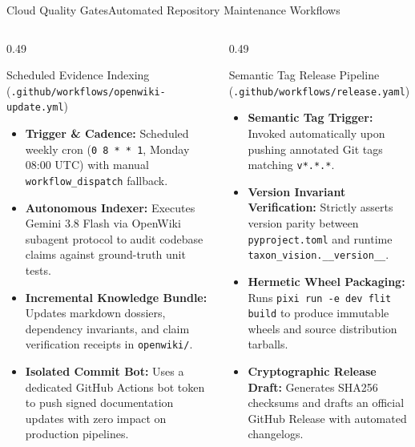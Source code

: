 \begin{frame}{Cloud Quality Gates}{Automated Repository Maintenance Workflows}
    \begin{columns}[T]
    \begin{column}{0.49\textwidth}
    \begin{block}{\small Scheduled Evidence Indexing (\texttt{.github/workflows/openwiki-update.yml})}
        \begin{itemize}\footnotesize
            \item \textbf{Trigger \& Cadence:} Scheduled weekly cron (\texttt{0 8 * * 1}, Monday 08:00 UTC) with manual \texttt{workflow\_dispatch} fallback.
            \item \textbf{Autonomous Indexer:} Executes Gemini 3.8 Flash via OpenWiki subagent protocol to audit codebase claims against ground-truth unit tests.
            \item \textbf{Incremental Knowledge Bundle:} Updates markdown dossiers, dependency invariants, and claim verification receipts in \texttt{openwiki/}.
            \item \textbf{Isolated Commit Bot:} Uses a dedicated GitHub Actions bot token to push signed documentation updates with zero impact on production pipelines.
        \end{itemize}
    \end{block}
    \end{column}
    \begin{column}{0.49\textwidth}
    \begin{block}{\small Semantic Tag Release Pipeline (\texttt{.github/workflows/release.yaml})}
        \begin{itemize}\footnotesize
            \item \textbf{Semantic Tag Trigger:} Invoked automatically upon pushing annotated Git tags matching \texttt{v*.*.*}.
            \item \textbf{Version Invariant Verification:} Strictly asserts version parity between \texttt{pyproject.toml} and runtime \texttt{taxon\_vision.\_\_version\_\_}.
            \item \textbf{Hermetic Wheel Packaging:} Runs \texttt{pixi run -e dev flit build} to produce immutable wheels and source distribution tarballs.
            \item \textbf{Cryptographic Release Draft:} Generates SHA256 checksums and drafts an official GitHub Release with automated changelogs.
        \end{itemize}
    \end{block}
    \end{column}
    \end{columns}


\end{frame}
